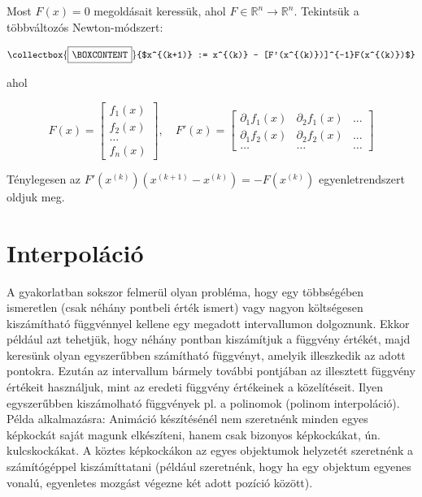 \documentclass[tikz,12pt,margin=0px]{article}
\newcommand{\mybox}{%
    \collectbox{%
        \setlength{\fboxsep}{4pt}%
        \fbox{\BOXCONTENT}%
    }%
}
\begin{document}
	Most $F(x) = 0$ megoldásait keressük, ahol $F \in \mathbb{R}^{n} \to \mathbb{R}^{n}$. Tekintsük a többváltozós Newton-módszert:
	
	\begin{displaymath}
		\mybox{$x^{(k+1)} := x^{(k)} - [F'(x^{(k)})]^{-1}F(x^{(k)})$}
	\end{displaymath}
	
	\noindent ahol
	
	\begin{displaymath}
		F(x) = \begin{bmatrix}
		f_{1}(x) \\[0.3em]
		f_{2}(x) \\[0.3em]
		\ldots  \\[0.3em]
		f_{n}(x)
		\end{bmatrix}, \quad
		F'(x) = \begin{bmatrix}
		\partial_{1}f_{1}(x) & \partial_{2}f_{1}(x)& ... \\[0.3em]
		\partial_{1}f_{2}(x) & \partial_{2}f_{2}(x)& ... \\[0.3em]
		\ldots & \ldots & \ldots
		\end{bmatrix}
	\end{displaymath}
	
	\noindent Ténylegesen az $F'(x^{(k)}) (x^{(k+1)} - x^{(k)}) = -F(x^{(k)})$ egyenletrendszert oldjuk meg.
	
	\section*{Interpoláció}
	
    \noindent A gyakorlatban sokszor felmerül olyan probléma, hogy egy többségében ismeretlen (csak néhány pontbeli érték ismert) vagy nagyon költségesen kiszámítható függvénnyel kellene egy megadott intervallumon dolgoznunk. Ekkor például azt tehetjük, hogy néhány pontban kiszámítjuk	a függvény értékét, majd keresünk olyan egyszerűbben számítható függvényt, amelyik illeszkedik az adott pontokra. Ezután az intervallum bármely további pontjában az illesztett függvény értékeit használjuk, mint az eredeti függvény értékeinek a közelítéseit. Ilyen egyszerűbben kiszámolható függvények pl. a polinomok (polinom interpoláció).\\
	
    \noindent Példa alkalmazásra: Animáció készítésénél nem szeretnénk minden egyes képkockát saját magunk elkészíteni, hanem csak bizonyos képkockákat, ún. kulcskockákat. A köztes képkockákon az egyes objektumok helyzetét szeretnénk a számítógéppel kiszámíttatani (például szeretnénk, hogy ha egy objektum egyenes vonalú, egyenletes mozgást végezne két adott pozíció között).
\end{document}
